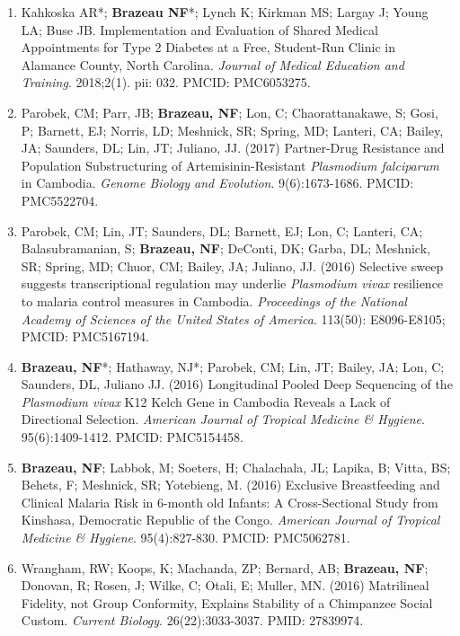 \documentclass[11pt,letterpaper]{article}
\begin{document}
\begin{enumerate}[leftmargin=*, itemsep=4pt, parsep=0pt]
\item Kahkoska AR*; \textbf{Brazeau NF}*; Lynch K; Kirkman MS; Largay J; Young LA; Buse JB. Implementation and Evaluation of Shared Medical Appointments for Type 2 Diabetes at a Free, Student-Run Clinic in Alamance County, North Carolina. \textit{Journal of Medical Education and Training}. 2018;2(1). pii: 032. PMCID: PMC6053275.

\item Parobek, CM; Parr, JB; \textbf{Brazeau, NF}; Lon, C; Chaorattanakawe, S; Gosi, P; Barnett, EJ; Norris, LD; Meshnick, SR; Spring, MD; Lanteri, CA; Bailey, JA; Saunders, DL; Lin, JT; Juliano, JJ. (2017) Partner-Drug Resistance and Population Substructuring of Artemisinin-Resistant \textit{Plasmodium falciparum} in Cambodia. \textit{Genome Biology and Evolution}. 9(6):1673-1686. PMCID: PMC5522704.

\item Parobek, CM; Lin, JT; Saunders, DL; Barnett, EJ; Lon, C; Lanteri, CA; Balasubramanian, S; \textbf{Brazeau, NF}; DeConti, DK; Garba, DL; Meshnick, SR; Spring, MD; Chuor, CM; Bailey, JA; Juliano, JJ. (2016) Selective sweep suggests transcriptional regulation may underlie \textit{Plasmodium vivax} resilience to malaria control measures in Cambodia. \textit{Proceedings of the National Academy of Sciences of the United States of America}. 113(50): E8096-E8105; PMCID: PMC5167194.

\item \textbf{Brazeau, NF}*; Hathaway, NJ*; Parobek, CM; Lin, JT; Bailey, JA; Lon, C; Saunders, DL, Juliano JJ. (2016) Longitudinal Pooled Deep Sequencing of the \textit{Plasmodium vivax} K12 Kelch Gene in Cambodia Reveals a Lack of Directional Selection. \textit{American Journal of Tropical Medicine \& Hygiene}. 95(6):1409-1412. PMCID: PMC5154458.

\item \textbf{Brazeau, NF}; Labbok, M; Soeters, H; Chalachala, JL; Lapika, B; Vitta, BS; Behets, F; Meshnick, SR; Yotebieng, M. (2016) Exclusive Breastfeeding and Clinical Malaria Risk in 6-month old Infants: A Cross-Sectional Study from Kinshasa, Democratic Republic of the Congo. \textit{American Journal of Tropical Medicine \& Hygiene}. 95(4):827-830. PMCID: PMC5062781.

\item Wrangham, RW; Koops, K; Machanda, ZP; Bernard, AB; \textbf{Brazeau, NF}; Donovan, R; Rosen, J; Wilke, C; Otali, E; Muller, MN. (2016) Matrilineal Fidelity, not Group Conformity, Explains Stability of a Chimpanzee Social Custom. \textit{Current Biology}. 26(22):3033-3037. PMID: 27839974.


\end{enumerate}
\end{document}
